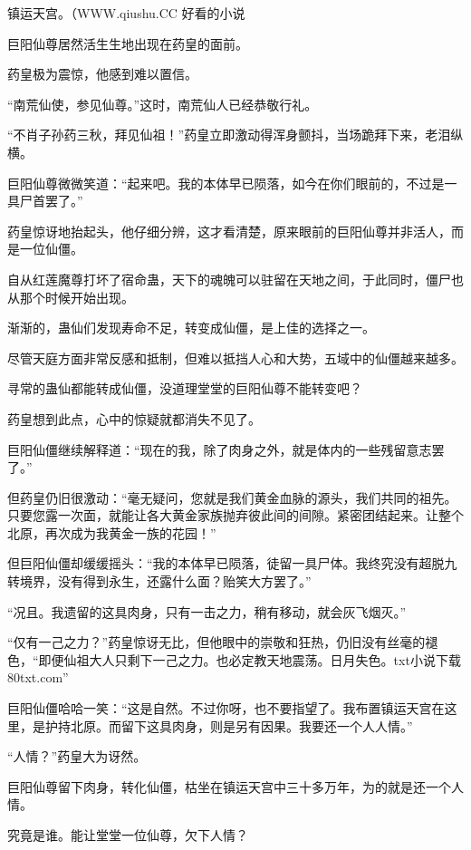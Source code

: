 
\begin{this_body}

镇运天宫。（WWW.qiushu.CC 好看的小说

巨阳仙尊居然活生生地出现在药皇的面前。

药皇极为震惊，他感到难以置信。

“南荒仙使，参见仙尊。”这时，南荒仙人已经恭敬行礼。

“不肖子孙药三秋，拜见仙祖！”药皇立即激动得浑身颤抖，当场跪拜下来，老泪纵横。

巨阳仙尊微微笑道：“起来吧。我的本体早已陨落，如今在你们眼前的，不过是一具尸首罢了。”

药皇惊讶地抬起头，他仔细分辨，这才看清楚，原来眼前的巨阳仙尊并非活人，而是一位仙僵。

自从红莲魔尊打坏了宿命蛊，天下的魂魄可以驻留在天地之间，于此同时，僵尸也从那个时候开始出现。

渐渐的，蛊仙们发现寿命不足，转变成仙僵，是上佳的选择之一。

尽管天庭方面非常反感和抵制，但难以抵挡人心和大势，五域中的仙僵越来越多。

寻常的蛊仙都能转成仙僵，没道理堂堂的巨阳仙尊不能转变吧？

药皇想到此点，心中的惊疑就都消失不见了。

巨阳仙僵继续解释道：“现在的我，除了肉身之外，就是体内的一些残留意志罢了。”

但药皇仍旧很激动：“毫无疑问，您就是我们黄金血脉的源头，我们共同的祖先。只要您露一次面，就能让各大黄金家族抛弃彼此间的间隙。紧密团结起来。让整个北原，再次成为我黄金一族的花园！”

但巨阳仙僵却缓缓摇头：“我的本体早已陨落，徒留一具尸体。我终究没有超脱九转境界，没有得到永生，还露什么面？贻笑大方罢了。”

“况且。我遗留的这具肉身，只有一击之力，稍有移动，就会灰飞烟灭。”

“仅有一己之力？”药皇惊讶无比，但他眼中的崇敬和狂热，仍旧没有丝毫的褪色，“即便仙祖大人只剩下一己之力。也必定教天地震荡。日月失色。txt小说下载80txt.com”

巨阳仙僵哈哈一笑：“这是自然。不过你呀，也不要指望了。我布置镇运天宫在这里，是护持北原。而留下这具肉身，则是另有因果。我要还一个人人情。”

“人情？”药皇大为讶然。

巨阳仙尊留下肉身，转化仙僵，枯坐在镇运天宫中三十多万年，为的就是还一个人情。

究竟是谁。能让堂堂一位仙尊，欠下人情？


\end{this_body}
